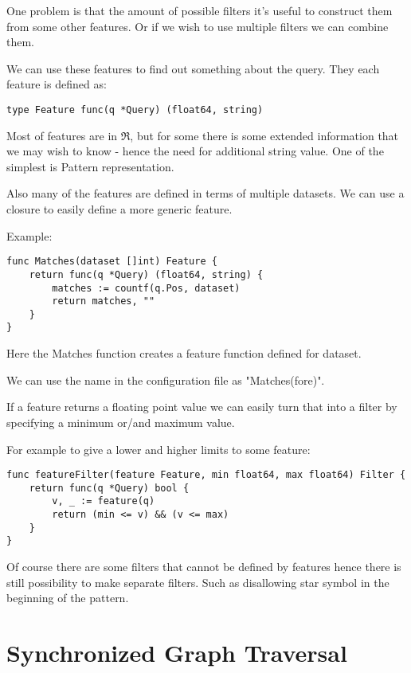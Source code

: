
One problem is that the amount of possible filters it's useful to construct them from some other features. Or if we wish to use multiple filters we can combine them.

We can use these features to find out something about the query. They each feature is defined as:

\begin{verbatim}
type Feature func(q *Query) (float64, string)
\end{verbatim}

Most of features are in $\Re$, but for some there is some extended information that we may wish to know - hence the need for additional string value. One of the simplest is Pattern representation.

Also many of the features are defined in terms of multiple datasets. We can use a closure to easily define a more generic feature.

Example:

\begin{verbatim}
func Matches(dataset []int) Feature {
    return func(q *Query) (float64, string) {
        matches := countf(q.Pos, dataset)
        return matches, ""
    }
}
\end{verbatim}

Here the Matches function creates a feature function defined for dataset.

We can use the name in the configuration file as "Matches(fore)".

If a feature returns a floating point value we can easily turn that into a filter by specifying a minimum or/and maximum value.

For example to give a lower and higher limits to some feature:

\begin{verbatim}
func featureFilter(feature Feature, min float64, max float64) Filter {
    return func(q *Query) bool {
        v, _ := feature(q)
        return (min <= v) && (v <= max)
    }
}
\end{verbatim}

Of course there are some filters that cannot be defined by features hence there is still possibility to make separate filters. Such as disallowing star symbol in the beginning of the pattern.

\section{Synchronized Graph Traversal}

